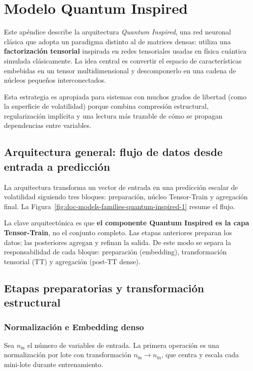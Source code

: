 
\chapter{Modelo Quantum Inspired}
\label{app:quantum-inspired}

Este apéndice describe la arquitectura \emph{Quantum Inspired}, una red neuronal clásica que adopta un paradigma distinto al de matrices densas: utiliza una \textbf{factorización tensorial} inspirada en redes tensoriales usadas en física cuántica simulada clásicamente. La idea central es convertir el espacio de características embebidas en un tensor multidimensional y descomponerlo en una cadena de núcleos pequeños interconectados.

Esta estrategia es apropiada para sistemas con muchos grados de libertad (como la superficie de volatilidad) porque combina compresión estructural, regularización implícita y una lectura más trazable de cómo se propagan dependencias entre variables.

\section{Arquitectura general: flujo de datos desde entrada a predicción}

La arquitectura transforma un vector de entrada en una predicción escalar de volatilidad siguiendo tres bloques: preparación, núcleo Tensor-Train y agregación final. La Figura~\ref{fig:doc-models-families-quantum-inspired-1} resume el flujo.

\DiagramModelsFamiliesQuantumInspiredOne

\noindent La clave arquitectónica es que \textbf{el componente Quantum Inspired es la capa Tensor-Train}, no el conjunto completo. Las etapas anteriores preparan los datos; las posteriores agregan y refinan la salida. De este modo se separa la responsabilidad de cada bloque: preparación (embedding), transformación tensorial (TT) y agregación (post-TT dense).

\section{Etapas preparatorias y transformación estructural}

\subsection{Normalización e Embedding denso}

Sea $n_{\text{in}}$ el número de variables de entrada. La primera operación es una normalización por lote con transformación $n_{\text{in}} \rightarrow n_{\text{in}}$, que centra y escala cada mini-lote durante entrenamiento.

